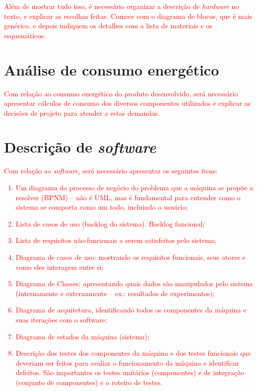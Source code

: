 \textcolor{red}{Além de mostrar tudo isso, é necessário organizar a descrição de \textit{hardware} no texto, e explicar as escolhas feitas. Comece com o diagrama de blocos, que é mais genérico, e depois indiquem os detalhes com a lista de materiais e os esquemáticos.}

\section{Análise de consumo energético}

\textcolor{red}{Com relação ao consumo energético do produto desenvolvido, será necessário apresentar cálculos de consumo dos diversos componentes utilizados e explicar as decisões de projeto para atender a estas demandas.}

\section{Descrição de \textit{software}}

\textcolor{red}{Com relação ao \textit{software}, será necessário apresentar os seguintes itens: %
\begin{enumerate}
    \item Um diagrama do processo de negócio do problema que a máquina se propõe a resolver (BPNM) – não é UML, mas é fundamental para entender como o sistema se comporta como um todo, incluindo o usuário;
    \item Lista de casos de uso (backlog do sistema). Backlog funcional;
    \item Lista de requisitos não-funcionais a serem satisfeitos pelo sistema;
    \item Diagrama de casos de uso: mostrando os requisitos funcionais, seus atores e como eles interagem entre si;
    \item Diagrama de Classes: apresentando quais dados são manipulados pelo sistema (internamente e externamente – ex.: resultados de experimentos);
    \item Diagrama de arquitetura, identificando todos os componentes da máquina e suas iterações com o software;
    \item Diagrama de estados da máquina (sistema);
    \item Descrição dos testes dos componentes da máquina e dos testes funcionais que deveriam ser feitos para avaliar o funcionamento da máquina e identificar defeitos. São importantes os testes unitários (componentes) e de integração (conjunto de componentes) e o roteiro de testes.
\end{enumerate}
}

